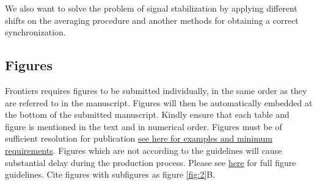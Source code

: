 \documentclass[utf8]{frontiersSCNS} %
\begin{document}
We also want to solve the problem of signal stabilization by applying different shifts on the averaging procedure and another methods for obtaining a correct synchronization.  



\subsection{Figures}
Frontiers requires figures to be submitted individually, in the same order as they are referred to in the manuscript. Figures will then be automatically embedded at the bottom of the submitted manuscript. Kindly ensure that each table and figure is mentioned in the text and in numerical order. Figures must be of sufficient resolution for publication \href{http://home.frontiersin.org/about/author-guidelines#ResolutionRequirements}{see here for examples and minimum requirements}. Figures which are not according to the guidelines will cause substantial delay during the production process. Please see \href{http://home.frontiersin.org/about/author-guidelines#GeneralStyleGuidelinesforFigures}{here} for full figure guidelines. Cite figures with subfigures as figure \ref{fig:2}B.
\end{document}
